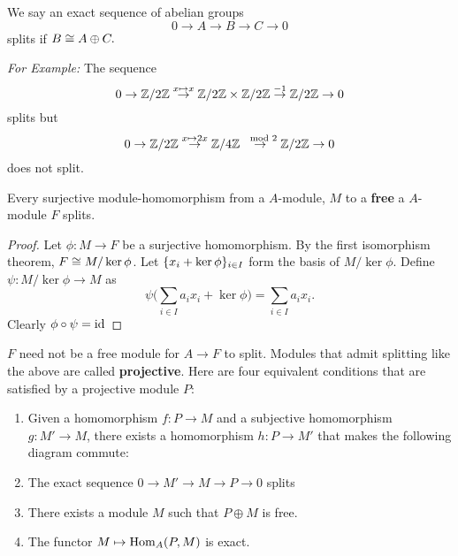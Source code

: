      We say an exact sequence of abelian groups
    $$0 \to A \to B \to C \to 0$$
    splits if $B \cong A \oplus C.$

    \noindent \textit{For Example: } The sequence
    $$0 \to \mathbb{Z}/2\mathbb{Z} \overset{x \mapsto x}{\to} \mathbb{Z}/2\mathbb{Z} \times \mathbb{Z}/2\mathbb{Z} \overset{-1}{\to} \mathbb{Z}/2\mathbb{Z} \to 0 $$
    splits but
    $$0  \to \mathbb{Z}/2\mathbb{Z} \overset{x \mapsto 2x}{\to} \mathbb{Z}/4\mathbb{Z} \overset{\mod 2}{\to} \mathbb{Z}/2\mathbb{Z} \to 0$$
    does not split.

    \begin{proposition}
        Every surjective module-homomorphism from a $A$-module, $M$ to a \textbf{free} a $A$-module $F$ splits.  
    \end{proposition}
    \begin{proof}
        Let $\phi: M \to F$ be a surjective homomorphism. By the first isomorphism theorem, $F \cong M/\ker \phi$. Let $\{x_i + \ker \phi\}_{i \in I}$ form the basis of $M/\ker \phi$. Define $\psi: M/\ker \phi \to M$ as
        $$\psi\bigg(\sum_{i \in I} a_i x_i + \ker \phi \bigg)= \sum_{i \in I} a_ix_i.$$ 
        Clearly $\phi \circ \psi = \text{id}$
    \end{proof}

    $F$ need not be a free module for $A \to F$ to split. Modules that admit splitting like the above are called \textbf{projective}. Here are four equivalent conditions that are satisfied by a projective module $P$:

    \begin{enumerate}
        \item Given a homomorphism $f: P \to M$ and a subjective homomorphism $g: M' \to M$, there exists a homomorphism $h: P \to M'$ that makes the following diagram commute:\\
       \begin{center}
       \end{center}
        \item The exact sequence $0 \to M' \to M \to P \to 0 $ splits
        \item There exists a module $M$ such that $P \oplus M$ is free.
        \item The functor $M \mapsto \mathrm{Hom}_A(P, M)$ is exact.
    \end{enumerate}

